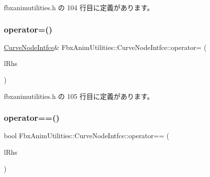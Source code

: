  fbxanimutilities.\+h の 104 行目に定義があります。

\mbox{\label{class_fbx_anim_utilities_1_1_curve_node_intfce_a3f44f01d0df459b322ef34607b41d792}} 
\subsubsection{\texorpdfstring{operator=()}{operator=()}}
{\footnotesize\ttfamily \hyperlink{class_fbx_anim_utilities_1_1_curve_node_intfce}{Curve\+Node\+Intfce}\& Fbx\+Anim\+Utilities\+::\+Curve\+Node\+Intfce\+::operator= (\begin{DoxyParamCaption}\item[{\hyperlink{class_fbx_anim_utilities_1_1_curve_node_intfce}{Curve\+Node\+Intfce} \&}]{l\+Rhs }\end{DoxyParamCaption})\hspace{0.3cm}{\ttfamily [inline]}}



 fbxanimutilities.\+h の 105 行目に定義があります。

\mbox{\label{class_fbx_anim_utilities_1_1_curve_node_intfce_a705d0c9ec97ebcdeb6bb01375ba5cc5b}} 
\subsubsection{\texorpdfstring{operator==()}{operator==()}}
{\footnotesize\ttfamily bool Fbx\+Anim\+Utilities\+::\+Curve\+Node\+Intfce\+::operator== (\begin{DoxyParamCaption}\item[{\hyperlink{class_fbx_anim_utilities_1_1_curve_node_intfce}{Curve\+Node\+Intfce} \&}]{l\+Rhs }\end{DoxyParamCaption})\hspace{0.3cm}{\ttfamily [inline]}}



